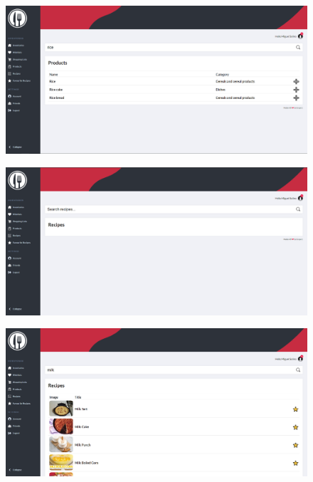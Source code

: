 \documentclass[a4paper]{report}
\begin{document}
    \begin{figure}[H]
        \centering
            \includegraphics[width=\textwidth]{images/produto_final/procura_de_produtos_efetuada.png}
    \end{figure}

    \begin{figure}[H]
        \centering
            \includegraphics[width=\textwidth]{images/produto_final/procura_de_receitas.png}
    \end{figure}

    \begin{figure}[H]
        \centering
            \includegraphics[width=\textwidth]{images/produto_final/procura_de_receitas_efetuadas.png}
    \end{figure}
\end{document}
